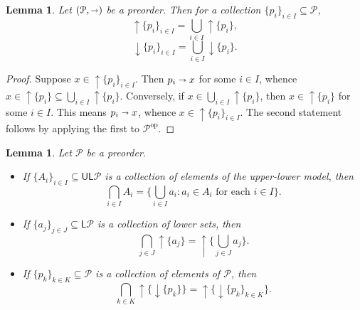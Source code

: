 \documentclass[12pt]{article}
\theoremstyle{definition}
\theoremstyle{plain}
\newtheorem{lemma}[definition]{Lemma}
\theoremstyle{plain}
\theoremstyle{plain}
\theoremstyle{plain}
\theoremstyle{remark}
\theoremstyle{remark}
\newcommand{\mc}[1]{\mathcal{#1}}
\newcommand{\sub}{\subseteq}
\newcommand{\low}{\mathsf{L}}
\newcommand{\upper}{\mathsf{U}}
\newcommand{\upc}[1]{{\uparrow #1}}
\newcommand{\lwc}[1]{{\downarrow #1}}
\begin{document}
\begin{lemma}\label{lem:exchange upc}
	Let $(\mc{P},\shortrightarrow)$ be a preorder. Then for a collection $\{p_i\}_{i \in I} \sub \mc{P}$,
	$$ \upc{\{p_i\}_{i \in I}} = \bigcup_{i \in I} \upc{\{p_i\}},$$
	$$ \lwc{\{p_i\}_{i \in I}} = \bigcup_{i \in I} \lwc{\{p_i\}}.$$
\end{lemma}
\begin{proof}
	Suppose $x \in \upc{\{p_i\}_{i \in I}}$. Then $p_i \shortrightarrow x$ for some $i \in I$, whence $x \in \upc{\{p_i\}} \sub \bigcup_{i \in I} \upc{\{p_i\}}$. Conversely, if $x \in \bigcup_{i \in I} \upc{\{p_i\}}$, then $x \in \upc{\{p_i\}}$ for some $i \in I$. This means $p_i \shortrightarrow x$, whence $x \in \upc{\{p_i\}_{i \in I}}$. The second statement follows by applying the first to $\mc{P}^\text{op}$.
\end{proof}
\newpage
\begin{lemma}\label{lem:intersection as union}
	Let $\mc{P}$ be a preorder.
	\begin{itemize}
		\item[(i)] If $\{ A_i \}_{i \in I} \sub \upper\low\mc{P}$ is a collection of elements of the upper-lower model, then
		$$\bigcap_{i \in I} A_i = \{ \bigcup_{i \in I} a_i : a_i \in A_i \text{ for each } i \in I \} .$$
		\item[(ii)] If $\{a_j\}_{j \in J} \sub \low\mc{P}$ is a collection of lower sets, then
		$$\bigcap_{j \in J} \upc{\{a_j\}} =\upc{ \{ \bigcup_{j \in J} a_j \}} .$$
		\item[(iii)] If $\{p_k\}_{k \in K} \sub \mc{P}$ is a collection of elements of $\mc{P}$, then
		$$\bigcap_{k \in K} \upc{\{ \lwc{\{p_k\}} \}} =\upc{ \{ \lwc{ \{p_k\}_{k \in K} } \}} .$$
	\end{itemize}	
\end{lemma} 
\end{document}
